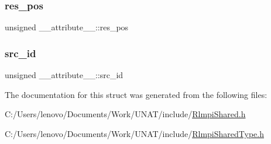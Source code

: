\mbox{\label{struct____attribute_____a5520bd158c9067709c4581ee299ffb68}} 
\subsubsection{\texorpdfstring{res\_pos}{res\_pos}}
{\footnotesize\ttfamily unsigned \+\_\+\+\_\+attribute\+\_\+\+\_\+\+::res\+\_\+pos}

\mbox{\label{struct____attribute_____ab5ad54f2c28857af1bdac6584a3a1968}} 
\subsubsection{\texorpdfstring{src\_id}{src\_id}}
{\footnotesize\ttfamily unsigned \+\_\+\+\_\+attribute\+\_\+\+\_\+\+::src\+\_\+id}



The documentation for this struct was generated from the following files\+:\begin{DoxyCompactItemize}
\item 
C\+:/\+Users/lenovo/\+Documents/\+Work/\+U\+N\+A\+T/include/\mbox{\hyperlink{include_2RlmpiShared_8h}{Rlmpi\+Shared.\+h}}\item 
C\+:/\+Users/lenovo/\+Documents/\+Work/\+U\+N\+A\+T/include/\mbox{\hyperlink{include_2RlmpiSharedType_8h}{Rlmpi\+Shared\+Type.\+h}}\end{DoxyCompactItemize}
